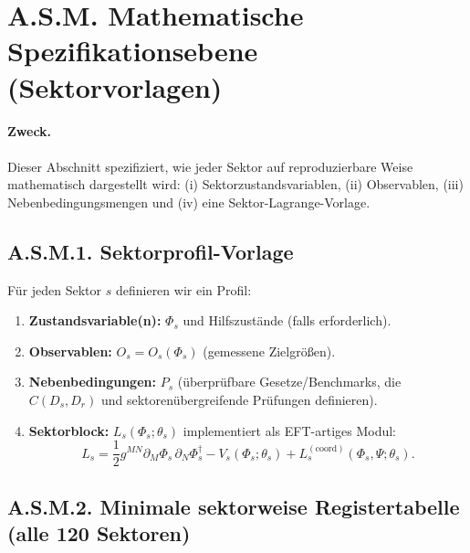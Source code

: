 \documentclass[13pt,a4paper]{article}
\begin{document}
	\section*{A.S.M. Mathematische Spezifikationsebene (Sektorvorlagen)}
	\label{sec:sector-math-layer}
	
	\paragraph{Zweck.}
	Dieser Abschnitt spezifiziert, wie jeder Sektor auf reproduzierbare Weise mathematisch dargestellt wird: (i) Sektorzustandsvariablen, (ii) Observablen, (iii) Nebenbedingungsmengen und (iv) eine Sektor-Lagrange-Vorlage.
	
	\subsection*{A.S.M.1. Sektorprofil-Vorlage}
	
	Für jeden Sektor $s$ definieren wir ein Profil:
	\begin{enumerate}[leftmargin=*]
		\item \textbf{Zustandsvariable(n):} $\Phi_s$ und Hilfszustände (falls erforderlich).
		\item \textbf{Observablen:} $O_s=O_s(\Phi_s)$ (gemessene Zielgrößen).
		\item \textbf{Nebenbedingungen:} $P_s$ (überprüfbare Gesetze/Benchmarks, die $C(D_s,D_r)$ und sektorenübergreifende Prüfungen definieren).
		\item \textbf{Sektorblock:} $L_s(\Phi_s;\theta_s)$ implementiert als EFT-artiges Modul:
		$$ L_s = \frac{1}{2}g^{MN}\partial_M\Phi_s\,\partial_N\Phi_s^\dagger - V_s(\Phi_s;\theta_s) + L^{(\mathrm{coord})}_s(\Phi_s,\Psi;\theta_s). $$
	\end{enumerate}
	
	\subsection*{A.S.M.2. Minimale sektorweise Registertabelle (alle 120 Sektoren)}
	
\end{document}
